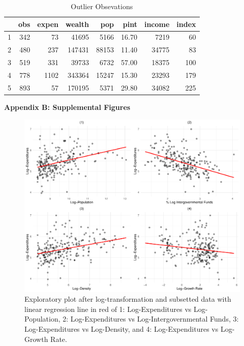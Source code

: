 \documentclass[11pt]{article}\usepackage[]{graphicx}\usepackage[]{color}
\makeatletter
\def\maxwidth{ %
  \ifdim\Gin@nat@width>\linewidth
    \linewidth
  \else
    \Gin@nat@width
  \fi
}
\makeatother
\begin{document}
\begin{center}
\begin{table}[ht]
\centering
\begin{tabular}{rrrrrrrr}
  \hline
 & obs & expen & wealth & pop & pint & income & index \\ 
  \hline
1 & 342 &  73 & 41695 & 5166 & 16.70 & 7219 &  60 \\ 
  2 & 480 & 237 & 147431 & 88153 & 11.40 & 34775 &  83 \\ 
  3 & 519 & 331 & 39733 & 6732 & 57.00 & 18375 & 100 \\ 
  4 & 778 & 1102 & 343364 & 15247 & 15.30 & 23293 & 179 \\ 
  5 & 893 &  57 & 170195 & 5371 & 29.80 & 34082 & 225 \\ 
   \hline
\end{tabular}
\caption{Outlier Obsevations} 
\label{outlier_obs}
\end{table}

\end{center}


\clearpage
\newpage
\noindent \Large{{\bf Appendix B: Supplemental Figures}}

\begin{figure}[h!] 
\begin{center}

\includegraphics[width=\maxwidth]{figure/unnamed-chunk-12-1} 

\caption{Exploratory plot after log-transformation and subsetted data with linear regression line in red of 1: Log-Expenditures vs Log-Population, 2: Log-Expenditures vs Log-Intergovernmental Funds, 3: Log-Expenditures vs Log-Density, and 4: Log-Expenditures vs Log- Growth Rate.}
\label{sec2-explore}
\end{center} 
\end{figure}
\end{document}
